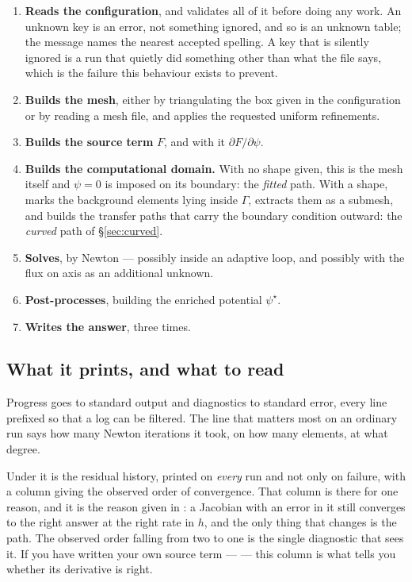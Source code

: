\begin{enumerate}

\item \textbf{Reads the configuration}, and validates all of it before doing any
	work. An unknown key is an error, not something ignored, and so is an
	unknown table; the message names the nearest accepted spelling. A key that
	is silently ignored is a run that quietly did something other than what the
	file says, which is the failure this behaviour exists to prevent.

\item \textbf{Builds the mesh}, either by triangulating the box given in the
	configuration or by reading a mesh file, and applies the requested uniform
	refinements.

\item \textbf{Builds the source term} $F$, and with it $\partial F/\partial\psi$.

\item \textbf{Builds the computational domain.} With no shape given, this is the
	mesh itself and $\psi = 0$ is imposed on its boundary: the \emph{fitted}
	path. With a shape, {\meq} marks the background elements lying inside
	$\Gamma$, extracts them as a submesh, and builds the transfer paths that
	carry the boundary condition outward: the \emph{curved} path of
	\S\ref{sec:curved}.

\item \textbf{Solves}, by Newton --- possibly inside an adaptive loop, and
	possibly with the flux on axis as an additional unknown.

\item \textbf{Post-processes}, building the enriched potential $\psi^{\star}$.

\item \textbf{Writes the answer}, three times.

\end{enumerate}

\subsection{What it prints, and what to read}

Progress goes to standard output and diagnostics to standard error, every line
prefixed so that a log can be filtered. The line that matters most on an
ordinary run says how many Newton iterations it took, on how many elements, at
what degree.

Under it is the residual history, printed on \emph{every} run and not only on
failure, with a column giving the observed order of convergence. That column is
there for one reason, and it is the reason given in : a Jacobian
with an error in it still converges to the right answer at the right rate in
$h$, and the only thing that changes is the path. The observed order falling
from two to one is the single diagnostic that sees it. If you have written your
own source term ---  --- this column is what tells you
whether its derivative is right.

